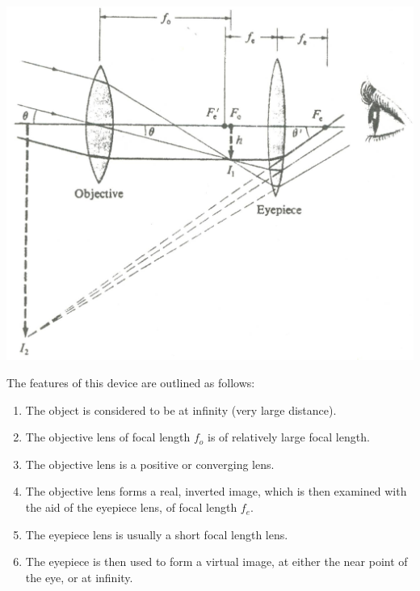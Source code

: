 \begin{multicols}{2}

\begin{center}
  \includegraphics[scale=0.7]{5bgraf/tscope}
  \label{f:tscope}
\end{center}


The features of this device are outlined as follows:
\begin{enumerate}
	\item The object is considered to be at infinity (very large distance). 
	\item The objective lens of focal length $f_o$ is of relatively large focal length.	
	\item The objective lens is a positive or converging lens.
	\item The objective lens forms a real, inverted image, which is then examined with the aid of the eyepiece lens, of focal length $f_e$. 
	\item The eyepiece lens is usually a short focal length lens.
	\item The eyepiece is then used to form a virtual image, at either the near point of the eye, or at infinity.
\end{enumerate}


\end{multicols}
